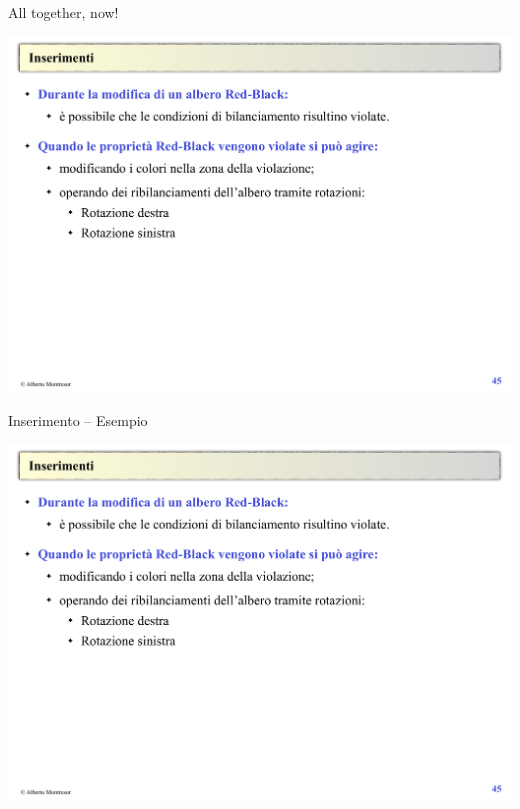 \begin{frame}{All together, now!}

\includegraphics[width=1.0\textwidth,page=18]{redblack2.pdf}

\end{frame}

\begin{frame}{Inserimento -- Esempio}

\includegraphics[width=1.0\textwidth,page=19]{redblack2.pdf}

\end{frame}

